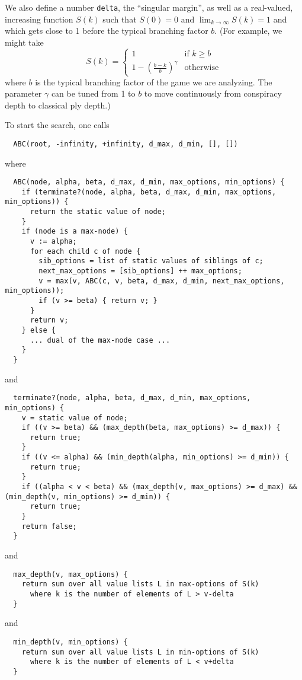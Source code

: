 \documentclass[10pt,dvipdfmx]{report}
\begin{document}
We also define a number \verb|delta|, the ``singular margin'', as well as a real-valued, increasing function
$S(k)$ such that $S(0)=0$ and $\lim_{k\to\infty}S(k)=1$ and which gets close to 1 before the typical
branching factor $b$.  (For example, we might take
\[ S(k) = \begin{cases}1&\text{if $k\geq b$}\\1-\left(\frac{b-k}{b}\right)^\gamma&\text{otherwise}\end{cases}\]
where $b$ is the typical branching factor of the game we are analyzing.
The parameter $\gamma$ can be tuned from 1 to $b$ to move continuously from conspiracy depth to classical
ply depth.)

To start the search, one calls
\begin{verbatim}
  ABC(root, -infinity, +infinity, d_max, d_min, [], [])
\end{verbatim}
where
\begin{verbatim}
  ABC(node, alpha, beta, d_max, d_min, max_options, min_options) {
    if (terminate?(node, alpha, beta, d_max, d_min, max_options, min_options)) {
      return the static value of node;
    }
    if (node is a max-node) {
      v := alpha;
      for each child c of node {
        sib_options = list of static values of siblings of c;
        next_max_options = [sib_options] ++ max_options;
        v = max(v, ABC(c, v, beta, d_max, d_min, next_max_options, min_options));
        if (v >= beta) { return v; }
      }
      return v;
    } else {
      ... dual of the max-node case ...
    }
  }
\end{verbatim}
and
\begin{verbatim}
  terminate?(node, alpha, beta, d_max, d_min, max_options, min_options) {
    v = static value of node;
    if ((v >= beta) && (max_depth(beta, max_options) >= d_max)) {
      return true;
    }
    if ((v <= alpha) && (min_depth(alpha, min_options) >= d_min)) {
      return true;
    }
    if ((alpha < v < beta) && (max_depth(v, max_options) >= d_max) && (min_depth(v, min_options) >= d_min)) {
      return true;
    }
    return false;
  }
\end{verbatim}
and
\begin{verbatim}
  max_depth(v, max_options) {
    return sum over all value lists L in max-options of S(k)
      where k is the number of elements of L > v-delta
  }
\end{verbatim}
and
\begin{verbatim}
  min_depth(v, min_options) {
    return sum over all value lists L in min-options of S(k)
      where k is the number of elements of L < v+delta
  }
\end{verbatim}
\end{document}
